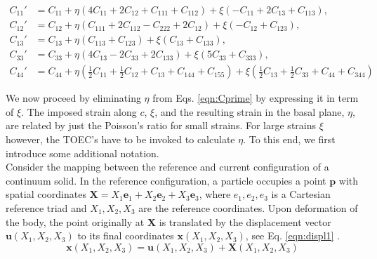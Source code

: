 \documentclass[showpacs,aps,floatfix,prb,reprint,superscriptaddress]{revtex4-1}
\begin{document}
\begin{widetext}
\begin{subequations}
\label{eqn:Cprime} 
\begin{align}
        C_{11}' &=C_{11} + \eta \left(4 C_{11} + 2C_{12} + C_{111} + C_{112}\right) + \xi \left(-C_{11} + 2C_{13} + C_{113}\right),\\
        C_{12}' &=C_{12} + \eta \left(C_{111} + 2C_{112} - C_{222} + 2C_{12}\right) + \xi \left(-C_{12} + C_{123}\right),\\
				C_{13}' &=C_{13} + \eta \left(C_{113} + C_{123} \right) + \xi \left(C_{13} + C_{133}\right),\\
				C_{33}' &=C_{33} + \eta \left(4C_{13} - 2C_{33} + 2C_{133} \right) + \xi \left(5C_{33} + C_{333}\right),\\
				C_{44}' &=C_{44} + \eta \left(\frac{1}{2} C_{11} + \frac{1}{2} C_{12} + C_{13} + C_{144} + C_{155} \right) + \xi \left(\frac{1}{2} C_{13} + \frac{1}{2} C_{33} + C_{44} + C_{344}\right)
\end{align}
\end{subequations}
\end{widetext}

We now proceed by eliminating $\eta$ from Eqs. \ref{eqn:Cprime} by expressing it in term of $\xi$. The imposed strain along $c$, $\xi$, and the resulting strain in the basal plane, $\eta$, are related by just the Poisson's ratio for small strains. For large strains $\xi$ however, the TOEC's have to be invoked to calculate $\eta$. To this end, we first introduce some additional notation. \\

Consider the mapping between the reference and current configuration of a continuum solid. In the reference configuration, a particle occupies a point $\bm{p}$ with spatial coordinates $\bm{X} = X_{1}\bm{e}_{1} +  X_{2}\bm{e}_{2} + X_{3}\bm{e}_{3}$, where ${e}_{1}, {e}_{2}, {e}_{3}$ is a Cartesian reference triad and $X_{1}, X_{2}, X_{3}$ are the reference coordinates. Upon deformation of the body, the point originally at $\bm{X}$ is translated by the displacement vector $\bm{u} \left(X_{1}, X_{2}, X_{3} \right)$ to its final coordinates $\bm{x} \left(X_{1}, X_{2}, X_{3} \right)$, see Eq. \ref{eqn:displ1} .
\begin{equation}
\label{eqn:displ1} 
\bm{x} \left(X_{1}, X_{2}, X_{3} \right) = \bm{u} \left(X_{1}, X_{2}, X_{3} \right) + \bm{X} \left(X_{1}, X_{2}, X_{3} \right)
\end{equation}
\end{document}
